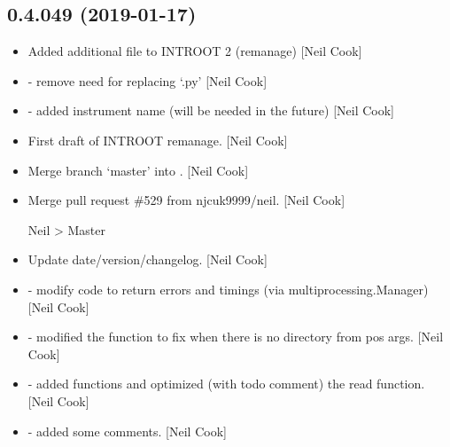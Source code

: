 \documentclass[a4paper,10pt,english]{report}
\begin{document}
\subsection{0.4.049 (2019-01-17)}
\label{\detokenize{misc/changelog:id214}}\begin{itemize}
\item {} 
Added additional file to INTROOT 2 (remanage) {[}Neil Cook{]}

\item {} 
 - remove need for replacing ‘.py’ {[}Neil Cook{]}

\item {} 
 - added instrument name (will be needed in the
future) {[}Neil Cook{]}

\item {} 
First draft of INTROOT remanage. {[}Neil Cook{]}

\item {} 
Merge branch ‘master’ into . {[}Neil Cook{]}

\item {} 
Merge pull request \#529 from njcuk9999/neil. {[}Neil Cook{]}

Neil \textendash{}\textgreater{} Master

\item {} 
Update date/version/changelog. {[}Neil Cook{]}

\item {} 
 - modify code to return errors and timings (via
multiprocessing.Manager) {[}Neil Cook{]}

\item {} 
 - modified the  function to
fix when there is no directory from pos args. {[}Neil Cook{]}

\item {} 
 - added  functions and optimized
(with todo comment) the read function. {[}Neil Cook{]}

\item {} 
 - added some comments. {[}Neil Cook{]}

\end{itemize}
\end{document}
